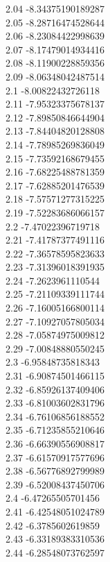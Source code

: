 {2.04	-8.34375190189287\\
2.05	-8.28716474528644\\
2.06	-8.23084422998639\\
2.07	-8.17479014934416\\
2.08	-8.11900228859356\\
2.09	-8.06348042487514\\
2.1	-8.00822432726118\\
2.11	-7.95323375678137\\
2.12	-7.89850846644904\\
2.13	-7.84404820128808\\
2.14	-7.78985269836049\\
2.15	-7.73592168679455\\
2.16	-7.68225488781359\\
2.17	-7.62885201476539\\
2.18	-7.57571277315225\\
2.19	-7.52283686066157\\
2.2	-7.47022396719718\\
2.21	-7.41787377491116\\
2.22	-7.36578595823633\\
2.23	-7.31396018391935\\
2.24	-7.2623961110544\\
2.25	-7.21109339111744\\
2.26	-7.16005166800114\\
2.27	-7.10927057805034\\
2.28	-7.05874975009812\\
2.29	-7.00848880550245\\
2.3	-6.95848735818343\\
2.31	-6.90874501466115\\
2.32	-6.85926137409406\\
2.33	-6.81003602831796\\
2.34	-6.76106856188552\\
2.35	-6.71235855210646\\
2.36	-6.66390556908817\\
2.37	-6.61570917577696\\
2.38	-6.56776892799989\\
2.39	-6.52008437450706\\
2.4	-6.47265505701456\\
2.41	-6.42548051024789\\
2.42	-6.3785602619859\\
2.43	-6.33189383310536\\
2.44	-6.28548073762597\\
}
